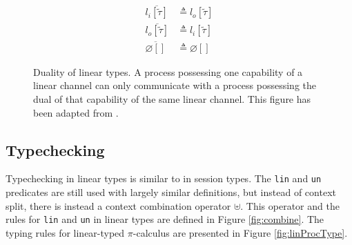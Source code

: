 \documentclass{l4proj}
\begin{document}
\begin{figure}[H]
\begin{align*}
\overline{l_{i}[\tilde{\tau}]} &\triangleq l_{o}[\tilde{\tau}] \\
\overline{l_{o}[\tilde{\tau}]} &\triangleq l_{i}[\tilde{\tau}] \\
\overline{\varnothing[]} &\triangleq \varnothing[]
\end{align*}
\caption{Duality of linear types. A process possessing one capability of a linear channel can only communicate with a process possessing the dual of that capability of the same linear channel. This figure has been adapted from \citet{DARDHA2017253}.}
\label{fig:linDual}
\end{figure}

\subsection{Typechecking}
\label{bgLinTCh}

\quad Typechecking in linear types is similar to in session types. The \texttt{lin} and \texttt{un} predicates are still used with largely similar definitions, but instead of context split, there is instead a context combination operator $\uplus$. This operator and the rules for \texttt{lin} and \texttt{un} in linear types are defined in Figure \ref{fig:combine}. The typing rules for linear-typed $\pi$-calculus are presented in Figure \ref{fig:linProcType}.
\end{document}
